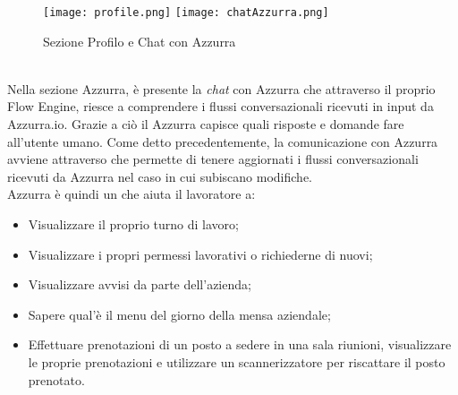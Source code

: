 \begin{trivlist}
	\begin{figure}[h]
		\begin{center}
			\texttt{[image: profile.png]}\hfil
			\texttt{[image: chatAzzurra.png]}
			\caption{Sezione Profilo e Chat con Azzurra}\label{fig:profile}
		\end{center}
	\end{figure}\\
	Nella sezione Azzurra, è presente la \emph{chat}  con Azzurra che attraverso il proprio Flow Engine, riesce a comprendere i flussi conversazionali ricevuti in input da Azzurra.io. Grazie a ciò il  Azzurra capisce quali risposte e domande fare all'utente umano. Come detto precedentemente, la comunicazione con Azzurra avviene attraverso  che permette di tenere aggiornati i flussi conversazionali ricevuti da Azzurra nel caso in cui subiscano modifiche. \\
	Azzurra è quindi un  che aiuta il lavoratore a:
	\begin{itemize}
		\item Visualizzare il proprio turno di lavoro;
		\item Visualizzare i propri permessi lavorativi o richiederne di nuovi;
		\item Visualizzare avvisi da parte dell'azienda;
		\item Sapere qual'è il menu del giorno della mensa aziendale;
		\item Effettuare prenotazioni di un posto a sedere in una sala riunioni, visualizzare le proprie prenotazioni e utilizzare un scannerizzatore  per riscattare il posto prenotato.
	\end{itemize}
\end{trivlist}	
